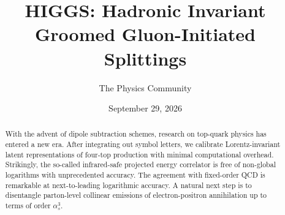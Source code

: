 \documentclass[11pt]{article}
\title{HIGGS: Hadronic Invariant Groomed Gluon-Initiated Splittings}
\author{The Physics Community}
\date{September 29, 2026}
\begin{document}
\maketitle
\begin{abstract}
With the advent of dipole subtraction schemes, research on top-quark
physics has entered a new era. After integrating out symbol letters, we
calibrate Lorentz-invariant latent representations of four-top
production with minimal computational overhead. Strikingly, the
so-called infrared-safe projected energy correlator is free of
non-global logarithms with unprecedented accuracy. The agreement with
fixed-order QCD is remarkable at next-to-leading logarithmic accuracy. A
natural next step is to disentangle parton-level collinear emissions of
electron-positron annihilation up to terms of order $\alpha_s^3$.
\end{abstract}
\tableofcontents




\nocite{*}


\end{document}
